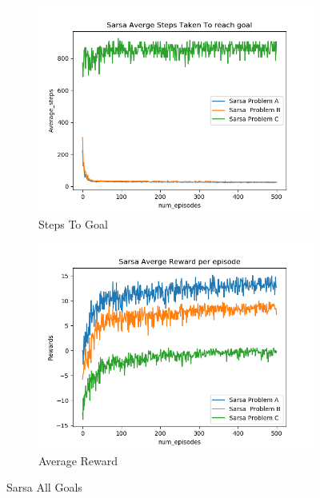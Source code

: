 \documentclass[12pt, letterpaper, twoside]{report}
\begin{document}
\begin{figure}[h!]
  \centering
  \begin{subfigure}[b]{0.7\linewidth}
    \includegraphics[width=\linewidth]{Sarsa_average_steps.png}
    \caption{Steps To Goal}
  \end{subfigure}
  \begin{subfigure}[b]{0.7\linewidth}
    \includegraphics[width=\linewidth]{Sarsa_Total_Returns.png}
    \caption{Average Reward}
  \end{subfigure}
  \caption{Sarsa All Goals}
  \label{fig:Eps-Greedy}
\end{figure}
\end{document}
